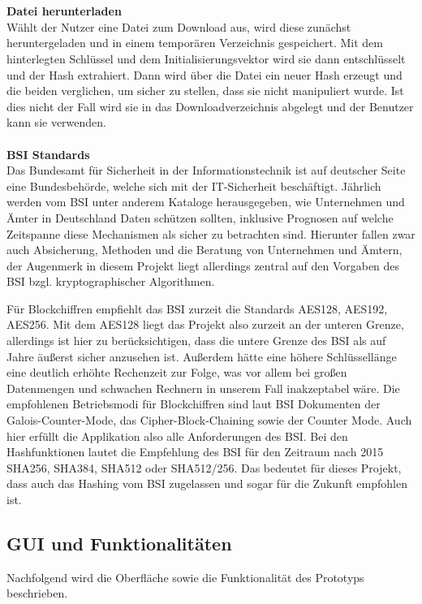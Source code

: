 \documentclass[12pt,a4paper,bibliography=totocnumbered,listof=totocnumbered]{scrartcl}
\begin{document}
\\\\\textbf{Datei herunterladen}\\
Wählt der Nutzer eine Datei zum Download aus, wird diese zunächst heruntergeladen und in einem temporären Verzeichnis gespeichert. Mit dem hinterlegten Schlüssel und dem Initialisierungsvektor wird sie dann entschlüsselt und der Hash extrahiert. Dann wird über die Datei ein neuer Hash erzeugt und die beiden verglichen, um sicher zu stellen, dass sie nicht manipuliert wurde. Ist dies nicht der Fall wird sie in das Downloadverzeichnis abgelegt und der Benutzer kann sie verwenden.
\\\\\textbf{BSI Standards}\\
Das Bundesamt für Sicherheit in der Informationstechnik ist auf deutscher Seite eine Bundesbehörde, welche sich mit der IT-Sicherheit beschäftigt. Jährlich werden vom BSI unter anderem Kataloge herausgegeben, wie Unternehmen und Ämter in Deutschland Daten schützen sollten, inklusive Prognosen auf welche Zeitspanne diese Mechanismen als sicher zu betrachten sind. Hierunter fallen zwar auch Absicherung, Methoden und die  Beratung von Unternehmen und Ämtern, der Augenmerk in diesem Projekt liegt allerdings zentral auf den Vorgaben des BSI bzgl. kryptographischer Algorithmen.

Für Blockchiffren empfiehlt das BSI zurzeit die Standards AES128, AES192, AES256. Mit dem AES128 liegt das Projekt also zurzeit an der unteren Grenze, allerdings ist hier zu berücksichtigen, dass die untere Grenze des BSI als auf Jahre äußerst sicher anzusehen ist. Außerdem hätte eine höhere Schlüssellänge eine deutlich erhöhte Rechenzeit zur Folge, was vor allem bei großen Datenmengen und schwachen Rechnern in unserem Fall inakzeptabel wäre. Die empfohlenen Betriebsmodi für Blockchiffren sind laut BSI Dokumenten der Galois-Counter-Mode, das Cipher-Block-Chaining sowie der Counter Mode. Auch hier erfüllt die Applikation also alle Anforderungen des BSI. Bei den Hashfunktionen lautet die Empfehlung des BSI für den Zeitraum nach 2015 SHA256, SHA384, SHA512 oder SHA512/256. Das bedeutet für dieses Projekt, dass auch das Hashing vom BSI zugelassen und sogar für die Zukunft empfohlen ist. \cite{12}\cite{13}

\subsection{GUI und Funktionalitäten}\label{GUIV}
Nachfolgend wird die Oberfläche sowie die Funktionalität des Prototyps beschrieben.
\end{document}
